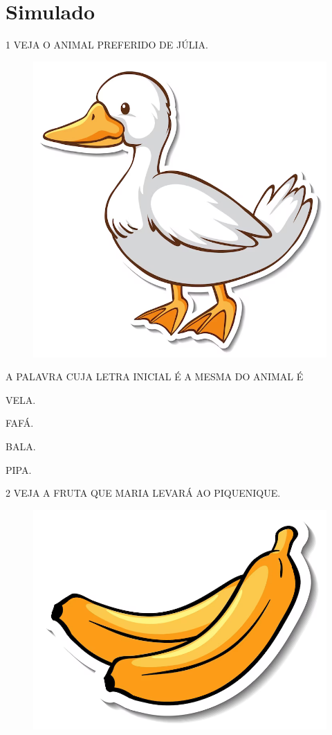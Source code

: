 \chapter[Simulado 4]{Simulado}

\num{1} VEJA O ANIMAL PREFERIDO DE JÚLIA.

\begin{figure}[H]
\centering
\includegraphics[width=.6\textwidth]{./media/image238.png}
\end{figure}

A PALAVRA CUJA LETRA INICIAL É A MESMA DO ANIMAL É

\begin{escolha}

\item VELA.

\item FAFÁ.

\item BALA.

\item PIPA.

\end{escolha}

\num{2} VEJA A FRUTA QUE MARIA LEVARÁ AO PIQUENIQUE.

\begin{figure}[H]
\centering
\includegraphics[width=\textwidth]{./media/image72.png}
\end{figure}

